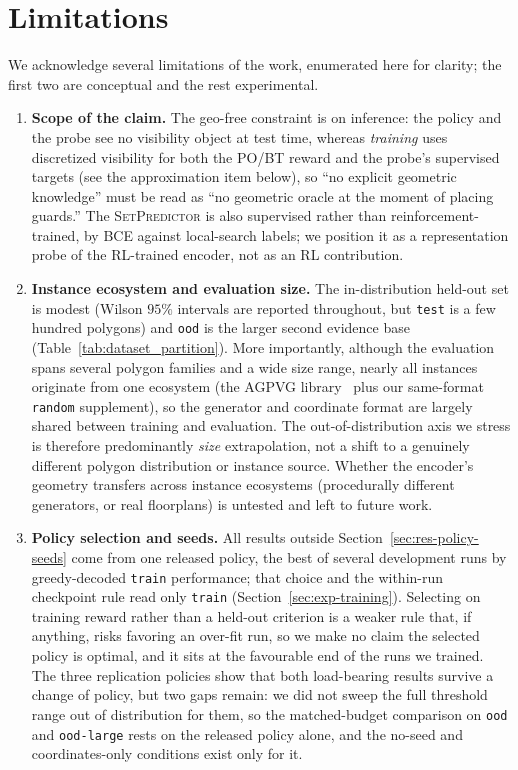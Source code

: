 \documentclass[11pt]{article}
\newcommand{\SetPredictor}{\textup{\textsc{SetPredictor}}}
\begin{document}
\section{Limitations}
\label{sec:limitations} 

We acknowledge several limitations of the work, enumerated here for clarity; the first two are conceptual and the rest experimental.

\begin{enumerate}
  \item \textbf{Scope of the claim.} The geo-free constraint is on inference: the policy and the probe see no visibility object at test time, whereas \emph{training} uses discretized visibility for both the PO/BT reward and the probe's supervised targets (see the approximation item below), so ``no explicit geometric knowledge'' must be read as ``no geometric oracle at the moment of placing guards.'' The \SetPredictor{} is also supervised rather than reinforcement-trained, by BCE against local-search labels; we position it as a representation probe of the RL-trained encoder, not as an RL contribution.
  \item \textbf{Instance ecosystem and evaluation size.} The in-distribution held-out set is modest (Wilson $95\%$ intervals are reported throughout, but \texttt{test} is a few hundred polygons) and \texttt{ood} is the larger second evidence base (Table~\ref{tab:dataset_partition}). More importantly, although the evaluation spans several polygon families and a wide size range, nearly all instances originate from one ecosystem (the AGPVG library~\cite{art-gallery-instances-page} plus our same-format \texttt{random} supplement), so the generator and coordinate format are largely shared between training and evaluation. The out-of-distribution axis we stress is therefore predominantly \emph{size} extrapolation, not a shift to a genuinely different polygon distribution or instance source. Whether the encoder's geometry transfers across instance ecosystems (procedurally different generators, or real floorplans) is untested and left to future work.
  \item \textbf{Policy selection and seeds.} All results outside Section~\ref{sec:res-policy-seeds} come from one released policy, the best of several development runs by greedy-decoded \texttt{train} performance; that choice and the within-run checkpoint rule read only \texttt{train} (Section~\ref{sec:exp-training}). Selecting on training reward rather than a held-out criterion is a weaker rule that, if anything, risks favoring an over-fit run, so we make no claim the selected policy is optimal, and it sits at the favourable end of the runs we trained. The three replication policies show that both load-bearing results survive a change of policy, but two gaps remain: we did not sweep the full threshold range out of distribution for them, so the matched-budget comparison on \texttt{ood} and \texttt{ood-large} rests on the released policy alone, and the no-seed and coordinates-only conditions exist only for it.


\end{enumerate}
\end{document}
